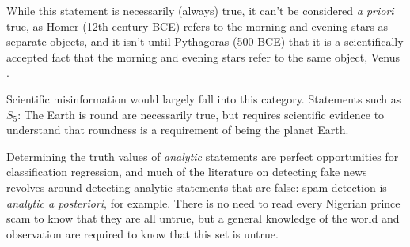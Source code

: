 While this statement is necessarily (always) true, it can't be considered \textit{a priori} true, as Homer (12th century BCE) refers to the morning and evening stars as separate objects, and it isn't until Pythagoras (500 BCE) that it is a scientifically accepted fact that the morning and evening stars refer to the same object, Venus \citep{dunne1978voyage}.

Scientific misinformation would largely fall into this category. Statements such as 
$S_5$: The Earth is round 
are necessarily true, but requires scientific evidence to understand that roundness is a requirement of being the planet Earth.  

Determining the truth values of \textit{analytic} statements are perfect opportunities for classification regression, and much of the literature on detecting fake news revolves around detecting analytic statements that are false: spam detection is \textit{analytic a posteriori}, for example. There is no need to read every Nigerian prince scam to know that they are all untrue, but a general knowledge of the world and observation are required to know that this set is untrue. 
